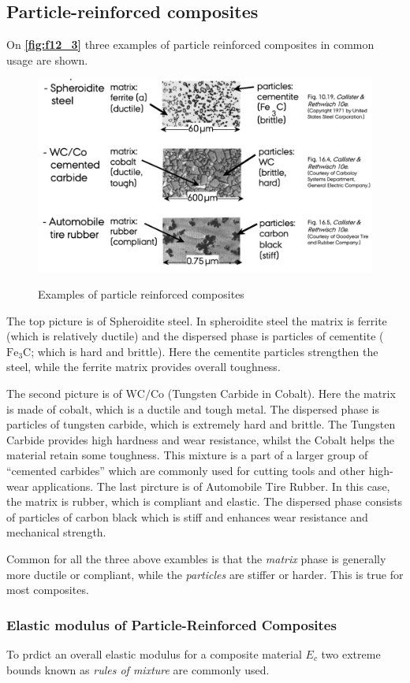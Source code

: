 \subsection{Particle-reinforced composites}
On \textbf{\autoref{fig:f12_3}} three examples of particle reinforced composites in common usage are shown.
\begin{figure} [ht]
  \centering
  \caption{Examples of particle reinforced composites}
  \includegraphics[width=0.6\linewidth]{./figures/f12_3.png}
  \label{fig:f12_3}
\end{figure}
The top picture is of Spheroidite steel. In spheroidite steel the matrix is ferrite (which is relatively ductile) and the dispersed phase is particles of cementite ($\mathrm{Fe}_3 \mathrm{C}$; which is hard and brittle). Here the cementite particles strengthen the steel, while the ferrite matrix provides overall toughness. 

The second picture is of $\mathrm{WC} / \mathrm{Co}$ (Tungsten Carbide in Cobalt). Here the matrix is made of cobalt, which is a ductile and tough metal. The  dispersed phase is particles of tungsten carbide, which is extremely hard and brittle. The Tungsten Carbide provides high hardness and wear resistance, whilst the Cobalt helps the material retain some toughness. This mixture is a part of a larger group of ``cemented carbides'' which are commonly used for cutting tools and other high-wear applications.
The last pircture is of Automobile Tire Rubber. In this case, the matrix is rubber, which is compliant and elastic. The dispersed phase consists of particles of carbon black which is stiff and enhances wear resistance and mechanical strength. 

Common for all the three above exambles is that the \textit{matrix} phase is generally more ductile or compliant, while the \textit{particles} are stiffer or harder. This is true for most composites.

\subsubsection{Elastic modulus of Particle-Reinforced Composites}
To prdict an overall elastic modulus for a composite material $E_c$ two extreme bounds known as \textit{rules of mixture} are commonly used.

